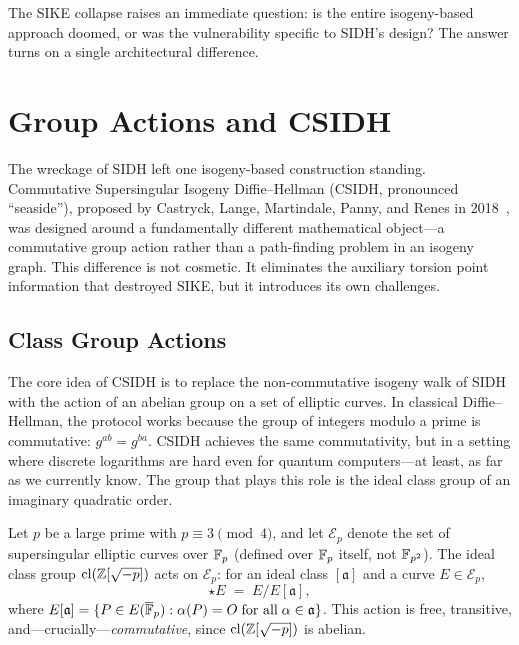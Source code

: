 The SIKE collapse raises an immediate question: is the entire isogeny-based approach doomed, or was the vulnerability specific to SIDH's design?  The answer turns on a single architectural difference.


\section{Group Actions and CSIDH}
\label{sec:csidh}

The wreckage of SIDH left one isogeny-based construction standing.  Commutative Supersingular Isogeny Diffie--Hellman (CSIDH, pronounced ``seaside''), proposed by Castryck, Lange, Martindale, Panny, and Renes in 2018~\cite{CSIDH2018}, was designed around a fundamentally different mathematical object---a commutative group action rather than a path-finding problem in an isogeny graph.  This difference is not cosmetic.  It eliminates the auxiliary torsion point information that destroyed SIKE, but it introduces its own challenges.

\subsection{Class Group Actions}
\label{subsec:class-group}

The core idea of CSIDH is to replace the non-commutative isogeny walk of SIDH with the action of an abelian group on a set of elliptic curves.  In classical Diffie--Hellman, the protocol works because the group of integers modulo a prime is commutative: $g^{ab} = g^{ba}$.  CSIDH achieves the same commutativity, but in a setting where discrete logarithms are hard even for quantum computers---at least, as far as we currently know.  The group that plays this role is the ideal class group of an imaginary quadratic order.

\begin{definition}
\label{def:group-action}
Let $p$ be a large prime with $p \equiv 3 \pmod{4}$, and let $\mathcal{E}_p$ denote the set of supersingular elliptic curves over $\mathbb{F}_p$ (defined over $\mathbb{F}_p$ itself, not $\mathbb{F}_{p^2}$).  The ideal class group $\mathrm{cl}(\mathbb{Z}[\sqrt{-p}])$ acts on $\mathcal{E}_p$: for an ideal class $[\mathfrak{a}]$ and a curve $E\in\mathcal{E}_p$,
\begin{equation}
[\mathfrak{a}] \star E \;=\; E / E[\mathfrak{a}],
\end{equation}
where $E[\mathfrak{a}] = \{P \in E(\overline{\mathbb{F}}_p) : \alpha(P) = O \;\text{for all}\; \alpha \in \mathfrak{a}\}$.
This action is free, transitive, and---crucially---\emph{commutative}, since $\mathrm{cl}(\mathbb{Z}[\sqrt{-p}])$ is abelian.
\end{definition}

